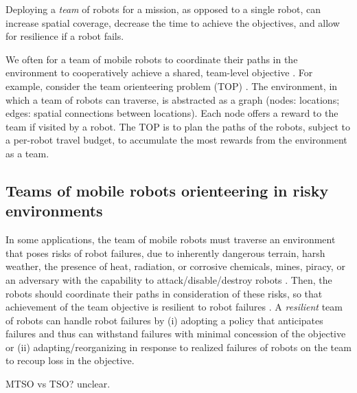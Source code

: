 \documentclass[11pt, oneside]{article}
\begin{document}
Deploying a \emph{team} of robots for a mission, as opposed to a single robot, can increase spatial coverage, decrease the time to achieve the objectives, and allow for resilience if a robot fails.

We often for a team of mobile robots to coordinate their paths in the environment to cooperatively achieve a shared, team-level objective \cite{parker2007distributed,lesser1999cooperative}.
For example, consider the team orienteering problem (TOP) \cite{gunawan2016orienteering,vansteenwegen2011orienteering}. 
The environment, in which a team of robots can traverse, is abstracted as a graph (nodes: locations; edges: spatial connections between locations). Each node offers a reward to the team if visited by a robot.
The TOP is to plan the paths of the robots, subject to a per-robot travel budget, to accumulate the most rewards from the environment as a team. 

\subsection{Teams of mobile robots orienteering in risky environments}
In some applications, the team of mobile robots must traverse an environment that poses risks of robot failures, due to inherently dangerous terrain, harsh weather, the presence of heat, radiation, or corrosive chemicals, mines, piracy, or an adversary with the capability to attack/disable/destroy robots \cite{agmon2017robotic}. Then, the robots should coordinate their paths in consideration of these risks, so that achievement of the team objective is resilient to robot failures \cite{zhou2021multi}. 
A \emph{resilient} team of robots \cite{prorok2021beyond} can handle robot failures by 
(i) adopting a policy that anticipates failures and thus can withstand failures with minimal concession of the objective
or
(ii) adapting/reorganizing in response to realized failures of robots on the team to recoup loss in the objective. 

{\color{red} MTSO vs TSO? unclear.}
\end{document}
